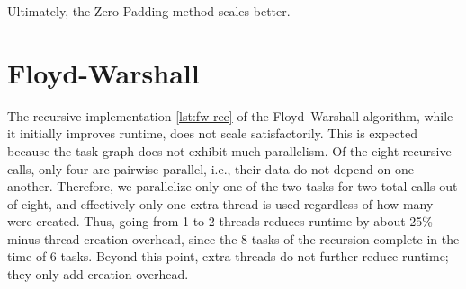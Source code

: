 \documentclass{article}
\newcommand{\eng}[1]{#1}
\begin{document}
Ultimately, the \eng{Zero Padding} method scales better.

\clearpage
\section{\eng{Floyd-Warshall}}

The recursive implementation \ref{lst:fw-rec} of the \eng{Floyd–Warshall} algorithm, while it initially improves runtime, does not scale satisfactorily. This is expected because the \eng{task graph} does not exhibit much parallelism. Of the eight recursive calls, only four are pairwise parallel, i.e., their data do not depend on one another. Therefore, we parallelize only one of the two \eng{tasks} for two total calls out of eight, and effectively only one \eng{extra thread} is used regardless of how many were created. Thus, going from 1 to 2 threads reduces runtime by about 25\% minus thread-creation overhead, since the 8 \eng{tasks} of the recursion complete in the time of \eng{6 tasks}. Beyond this point, extra threads do not further reduce runtime; they only add creation overhead.
\end{document}
